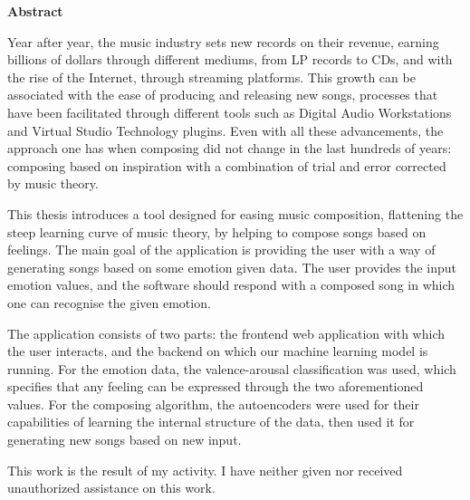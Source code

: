 \thispagestyle{plain}
\begin{center}
    \Large
    \textbf{Abstract}

    \vspace{0.4cm}


\end{center}
Year after year, the music industry sets new records on their revenue,
earning billions of dollars through different mediums,
from LP records to  CDs, and with the rise of the Internet,
through streaming platforms.
This growth can be associated with the ease of producing
and releasing new songs, processes that have been facilitated
through different tools such as Digital Audio Workstations
and Virtual Studio Technology plugins. Even with all these advancements,
the approach one has when composing did not change in the last hundreds of
years: composing based on inspiration with a combination of
trial and error corrected by music theory.

This thesis introduces a tool designed for easing music composition,
flattening the steep learning curve of music theory,
by helping to compose songs based on feelings.
The main goal of the application is providing the user with a way of
generating songs based on some emotion given data.
The user provides the input emotion values,
and the software should respond with a composed song in which one can
recognise the given emotion.

The application consists of two parts:
the frontend web application with which the user interacts,
and the backend on which our machine learning model is running.
For the emotion data, the valence-arousal classification was used,
which specifies that any feeling can be expressed through the two aforementioned
values. For the composing algorithm, the autoencoders were used
for their capabilities of learning the internal structure of the
data, then used it for generating new songs based on new input.

This work is the result of my activity.
I have neither given nor received unauthorized assistance on this work.
